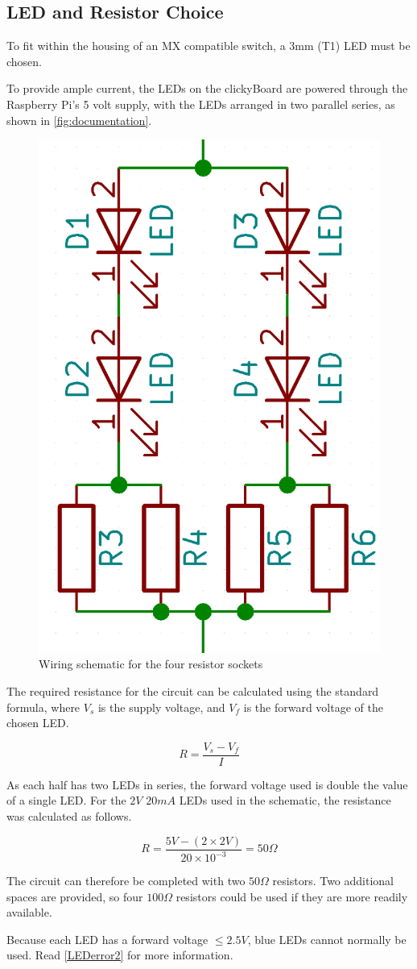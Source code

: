 \documentclass[10pt, a4paper, onesided]{article}
\begin{document}
	
	
	\subsection{LED and Resistor Choice}
	\label{LEDresistors}

	To fit within the housing of an MX compatible switch, a 3mm (T1) LED must be chosen.
	
	To provide ample current, the LEDs on the clickyBoard are powered through the Raspberry Pi's 5 volt supply, with the LEDs arranged in two parallel series, as shown in \autoref*{fig:documentation}.
	
	\begin{figure}[h]
		\centering
		\includegraphics[width=0.25\linewidth]{img/resistor}
		\caption{Wiring schematic for the four resistor sockets}
		\label{fig:documentation}
	\end{figure}
	
	The required resistance for the circuit can be calculated using the standard formula, where $V_s$ is the supply voltage, and $V_f$ is the forward voltage of the chosen LED.
	
	\begin{displaymath}
		R = \frac{V_s - V_f}{I}
	\end{displaymath}
	
	As each half has two LEDs in series, the forward voltage used is double the value of a single LED. For the $2 V$ $20 mA$ LEDs used in the schematic, the resistance was calculated as follows.
	
	\begin{displaymath}
		R = \frac{5 V - (2 \times 2 V)}{20 \times 10^{-3}} = 50 \Omega
	\end{displaymath}
	
	The circuit can therefore be completed with two $50 \Omega$ resistors. Two additional spaces are provided, so four $100 \Omega$ resistors could be used if they are more readily available.
	
	Because each LED has a forward voltage $\le 2.5 V$, blue LEDs cannot normally be used. Read \autoref{LEDerror2} for more information.
	
\end{document}
